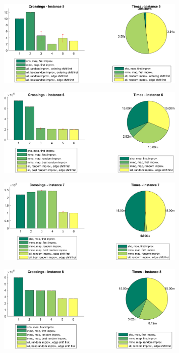 \documentclass[11pt]{article}
\begin{document}
\begin{figure}[h]
\centering
\includegraphics[width=0.8\textwidth]{instance5}
\end{figure}

\begin{figure}[h]
\centering
\includegraphics[width=0.8\textwidth]{instance6}
\end{figure}

\begin{figure}[h]
\centering
\includegraphics[width=0.8\textwidth]{instance7}
\end{figure}

\begin{figure}[h]
\centering
\includegraphics[width=0.8\textwidth]{instance8}
\end{figure}
\end{document}
